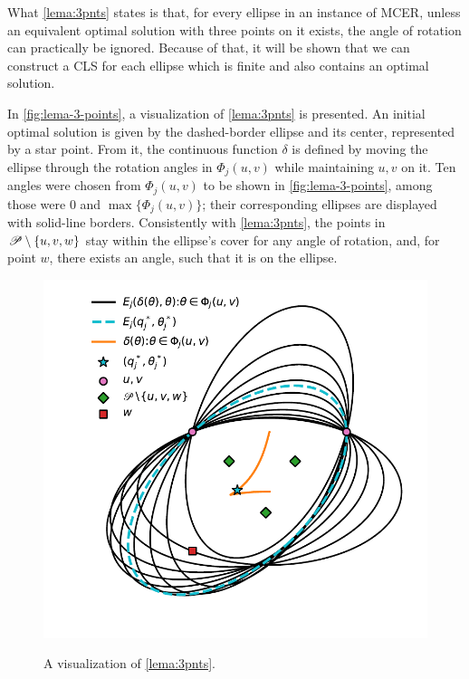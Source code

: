 What \autoref{lema:3pnts} states is that, for every ellipse in an instance of MCER, unless an equivalent optimal solution with three points on it exists, the angle of rotation can practically be ignored. Because of that, it will be shown that we can construct a CLS for each ellipse which is finite and also contains an optimal solution.

In \autoref{fig:lema-3-points}, a visualization of \autoref{lema:3pnts} is presented.
An initial optimal solution is given by the dashed-border ellipse and its center, represented by a star point. From it, the continuous function $\delta$ is defined by moving the ellipse through the rotation angles in $\Phi_j(u,v)$ while maintaining $u, v$ on it. Ten angles were chosen from $\Phi_j(u,v)$ to be shown in \autoref{fig:lema-3-points}, among those were $0$ and $\max\{\Phi_j(u,v)\}$; their corresponding ellipses are displayed with solid-line borders.
Consistently with \autoref{lema:3pnts}, the points in $\mathscr{P} \setminus \{u, v, w\}$ stay within the ellipse's cover for any angle of rotation, and, for point $w$, there exists an angle, such that it is on the ellipse.  

\begin{figure}[H]
	\centering
	\caption{A visualization of \autoref{lema:3pnts}.}
	\includegraphics[scale=.9]{tex/figures/lema-3-points}
	\fautor
	\label{fig:lema-3-points}
\end{figure}

